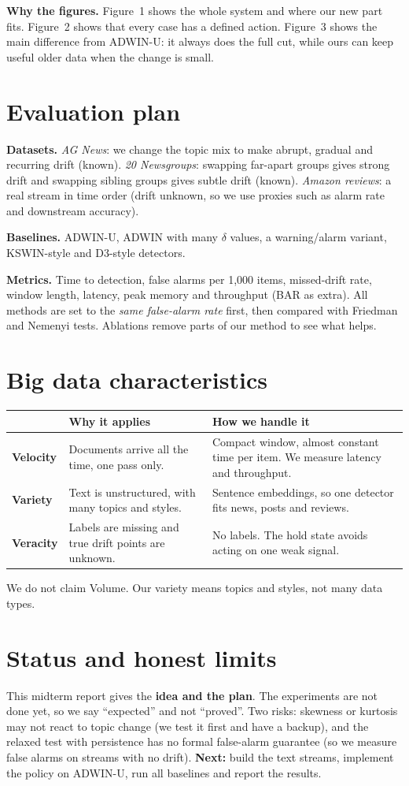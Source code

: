 \documentclass[10pt,a4paper]{article}
\begin{document}
\textbf{Why the figures.} Figure~1 shows the whole system and where our new part fits. Figure~2 shows that every case has a defined action. Figure~3 shows the main difference from ADWIN-U: it always does the full cut, while ours can keep useful older data when the change is small.

\section{Evaluation plan}
\textbf{Datasets.} \emph{AG News}: we change the topic mix to make abrupt, gradual and recurring drift (known). \emph{20 Newsgroups}: swapping far-apart groups gives strong drift and swapping sibling groups gives subtle drift (known). \emph{Amazon reviews}: a real stream in time order (drift unknown, so we use proxies such as alarm rate and downstream accuracy).

\textbf{Baselines.} ADWIN-U, ADWIN with many $\delta$ values, a warning/alarm variant, KSWIN-style and D3-style detectors.

\textbf{Metrics.} Time to detection, false alarms per 1,000 items, missed-drift rate, window length, latency, peak memory and throughput (BAR as extra). All methods are set to the \emph{same false-alarm rate} first, then compared with Friedman and Nemenyi tests. Ablations remove parts of our method to see what helps.

\section{Big data characteristics}
\noindent\begin{tabular}{@{}>{\bfseries}p{1.6cm}p{7.2cm}p{7.2cm}@{}}
\toprule
 & Why it applies & How we handle it \\
\midrule
Velocity & Documents arrive all the time, one pass only. & Compact window, almost constant time per item. We measure latency and throughput. \\
Variety & Text is unstructured, with many topics and styles. & Sentence embeddings, so one detector fits news, posts and reviews. \\
Veracity & Labels are missing and true drift points are unknown. & No labels. The hold state avoids acting on one weak signal. \\
\bottomrule
\end{tabular}\par\smallskip
We do not claim Volume. Our variety means topics and styles, not many data types.

\section{Status and honest limits}
This midterm report gives the \textbf{idea and the plan}. The experiments are not done yet, so we say ``expected'' and not ``proved''. Two risks: skewness or kurtosis may not react to topic change (we test it first and have a backup), and the relaxed test with persistence has no formal false-alarm guarantee (so we measure false alarms on streams with no drift). \textbf{Next:} build the text streams, implement the policy on ADWIN-U, run all baselines and report the results.
\end{document}
